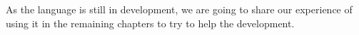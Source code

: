 As the language is still in development, we are going to share our experience of using it in the remaining chapters to try to help the development.

